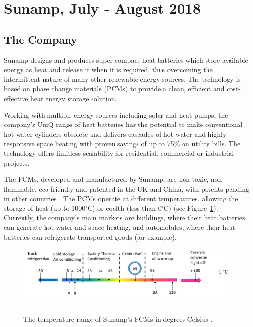 

\section{Sunamp, July - August 2018} \label{sec:sunamp}


\subsection*{The Company}


Sunamp designs and produces super-compact heat batteries which store available energy as heat and release it when it is required, thus overcoming the intermittent nature of many other renewable energy sources.
The technology is based on phase change materials (PCMs) to provide a clean, efficient and cost-effective heat energy storage solution.


Working with multiple energy sources including solar and heat pumps, the company’s UniQ range of heat batteries has the potential to make conventional hot water cylinders obsolete and delivers cascades of hot water and highly responsive space heating with proven savings of up to 75\% on utility bills.
The technology offers limitless scalability for residential, commercial or industrial projects.




The PCMs, developed and manufactured by Sunamp, are non-toxic, non-flammable, eco-friendly and patented in the UK and China, with patents pending in other countries \citep{SunampAutomotive}.
The PCMs operate at different temperatures, allowing the storage of heat (up to 1000$^{\circ}$C) or coolth (less than 0$^{\circ}$C) (see Figure~\ref{pcm_temp_range}).
Currently, the company's main markets are buildings, where their heat batteries can generate hot water and space heating, and automobiles, where their heat batteries can refrigerate transported goods (for example).

\begin{figure}[htbp]
	\centering
	\includegraphics[width=\textwidth]{figures/temperature-range-of-PCMs.jpg}
	\rule{\textwidth}{0.5pt} %
	\caption{The temperature range of Sunamp's PCMs in degrees Celsius \citep{SunampAutomotive}.}
	\label{pcm_temp_range}
\end{figure}


